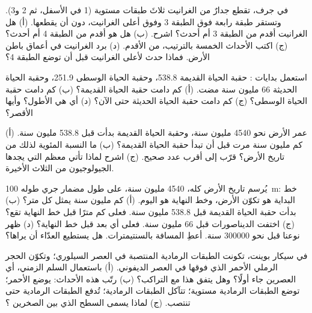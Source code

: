 \begin{exercise}[$\star\star$]\label{exo:g7:geological-time:5}
في جرف، تقطع جدارٌ من الغرانيت ثلاثَ طبقات مستوية (1 في الأسفل، ثم 2 و3).
وتستقر طبقة رابعة فوق الطبقة 3 وفوق أعلى الغرانيت، دون أن يقطعها. (أ) هل
الغرانيت أقدم من الطبقة 3 أم أحدث؟ اشرح. (ب) هل هو أقدم من الطبقة 4 أم
أحدث؟ (ج) اكتب الأحداث الخمسة بالترتيب، من الأقدم. (د) برد الغرانيت في
أعماق باطن الأرض. فماذا حدث لأعلى الغرانيت قبل أن توضع الطبقة 4؟
\end{exercise}

\begin{exercise}[$\star\star$]\label{exo:g7:geological-time:6}
استعمل بدايات : حقبة الحياة القديمة \num{538.8}، وحقبة الحياة الوسطى
\num{251.9}، وحقبة الحياة الحديثة \num{66} مليون سنة مضت. (أ) كم دامت حقبة
الحياة القديمة؟ (ب) كم دامت حقبة الحياة الوسطى؟ (ج) كم دامت حقبة الحياة
الحديثة حتى الآن؟ (د) أي  هي الأطول؟ وأيها الأقصر؟
\end{exercise}

\begin{exercise}[$\star\star$]\label{exo:g7:geological-time:7}
عمر الأرض نحو \num{4540} مليون سنة، وحقبة الحياة القديمة بدأت قبل
\num{538.8} مليون سنة. (أ) كم مليون سنة مرت قبل أن تبدأ حقبة الحياة
القديمة؟ (ب) ما النسبة المئوية لذلك من تاريخ الأرض؟ قرّب إلى أقرب عدد صحيح.
(ج) اشرح لماذا تأتي معظم  التي يجدها الجيولوجيون من  الثلاث
الأخيرة.
\end{exercise}

\begin{exercise}[$\star\star$]\label{exo:g7:geological-time:8}
يُرسم تاريخ الأرض كله، \num{4540} مليون سنة، على طول مضمار جري طوله
\qty{100}{m}: خط البداية هو تكوّن الأرض، وخط النهاية هو اليوم. (أ) كم مليون
سنة يمثل كل متر؟ (ب) بدأت حقبة الحياة القديمة قبل \num{538.8} مليون سنة.
فعلى كم مترًا قبل خط النهاية تقع؟ (ج) اختفت الديناصورات قبل \num{66}
مليون سنة. فعلى أي بعد قبل خط النهاية؟ (د) ظهر نوعنا قبل نحو \num{300000}
سنة. أعطِ المسافة بالسنتيمترات. هل يستطيع العدّاء أن يراها؟
\end{exercise}

\begin{exercise}[$\star\star$]\label{exo:g7:geological-time:9}
في سيكار بوينت، تكونت الطبقات الرمادية المنتصبة في العصر السيلوري؛ وتكوّن
الحجر الرملي الأحمر الذي فوقها في العصر الديفوني. (أ) باستعمال السلم
الزمني، أي العصرين جاء أولًا؟ وهل يتفق هذا مع التراكب؟ (ب) رتّب هذه
الأحداث: يوضع  الأحمر؛ توضع الطبقات الرمادية مستوية؛ تتآكل الطبقات
الرمادية؛ تُدفع الطبقات الرمادية حتى تنتصب. (ج) لماذا يسمى السطح الذي بين
الصخرين ؟
\end{exercise}

